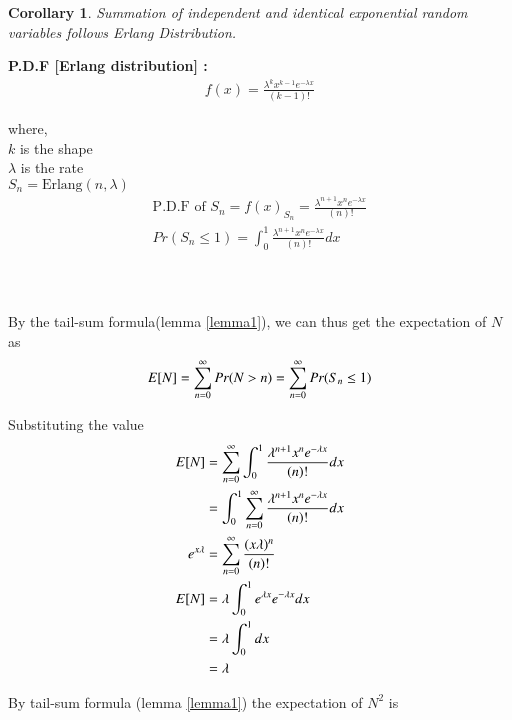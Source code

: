 \documentclass[journal,12pt,twocolumn]{IEEEtran}
\newtheorem{corollary}{Corollary}[theorem]
\theoremstyle{definition}
\begin{document}
\begin{corollary}
Summation of independent and identical exponential random variables follows Erlang Distribution.\\
\end{corollary}
\textbf{P.D.F [Erlang distribution] : }\\
\begin{align}
    f(x) = \frac{\lambda^{k} x^{k-1}e^{-\lambda x}}{(k-1)!}
\end{align}

where,\\
$k$ is the shape\\
$\lambda$ is the rate\\

$S_n = \text{Erlang}(n,\lambda)$ \\
\begin{align}
    \text{P.D.F of }S_n = f(x)_{S_n} = \frac{\lambda^{n+1} x^{n}e^{-\lambda x}}{(n)!}\\
    Pr(S_n \leq 1) = \int _0 ^1 \frac{\lambda^{n+1} x^{n}e^{-\lambda x}}{(n)!} dx
\end{align}
 \\ \\ \\
 
 By the tail-sum formula(lemma \ref{lemma1}), we can thus get the expectation of $N$ as\\
\begin{align}
    E[ N ] = \sum ^\infty _{n = 0} Pr(N > n) = \sum ^\infty _{n = 0} Pr(S_n \leq 1)
\end{align}

Substituting the value\\

\begin{align}
    E[ N ] &= \sum _{n = 0} ^\infty \int _0 ^1  \frac{\lambda^{n+1} x^{n}e^{-\lambda x}}{(n)!} dx\\
    &= \int _0 ^1 \sum _{n = 0} ^\infty \frac{\lambda^{n+1} x^{n}e^{-\lambda x}}{(n)!} dx\\
    e^{x\lambda} &= \sum _{n = 0} ^ \infty\frac{(x\lambda)^n}{(n)!}\\
    E[ N ] &=\lambda  \int _0 ^1 e^{\lambda x} e^{-\lambda x} dx\\
    &= \lambda \int _0 ^1 dx\\
    &= \lambda
\end{align}

By tail-sum formula (lemma \ref{lemma1}) the expectation of $N^2$ is\\
\end{document}
